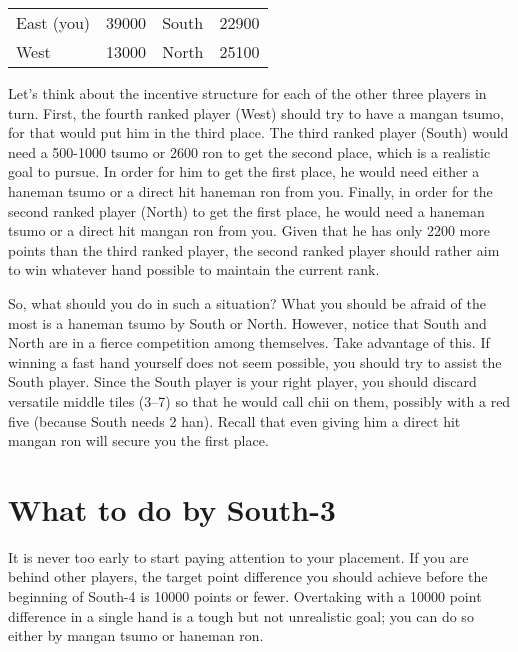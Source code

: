 \begin{table}[h]
\begin{center}
\begin{tabular}{l r l r}
East (you) & 39000 & South & 22900\\
West & 13000 & North & 25100\\
\end{tabular}
\end{center}
\vspace{-10pt}
\end{table}

Let's think about the incentive structure for each of the other three players in turn. First, the fourth ranked player (West) should try to have a {\jap mangan tsumo}, for that would put him in the third place. The third ranked player (South) would need a 500-1000 {\jap tsumo} or 2600 {\jap ron} to get the second place, which is a realistic goal to pursue. In order for him to get the first place, he would need either a {\jap haneman tsumo} or a direct hit {\jap haneman ron} from you. Finally, in order for the second ranked player (North) to get the first place, he would need a {\jap haneman tsumo} or a direct hit {\jap mangan ron} from you. Given that he has only 2200 more points than the third ranked player, the second ranked player should rather aim to win whatever hand possible to maintain the current rank. 

\bigskip
So, what should you do in such a situation? 
What you should be afraid of the most is a {\jap haneman tsumo} by South or North. However, notice that South and North are in a fierce competition among themselves. Take advantage of this. If winning a fast hand yourself does not seem possible, you should try to assist the South player. Since the South player is your right player, you should discard versatile middle tiles (3--7) so that he would call {\jap chii} on them, possibly with a red five (because South needs 2 {\jap han}). Recall that even giving him a direct hit {\jap mangan ron} will secure you the first place. 

\newpage
\section{What to do by South-3}
It is never too early to start paying attention to your placement. If you are behind other players, the target point difference you should achieve before the beginning of South-4 is 10000 points or fewer. Overtaking with a 10000 point difference in a single hand is a tough but not unrealistic goal; you can do so either by {\jap mangan tsumo} or {\jap haneman ron}. 

